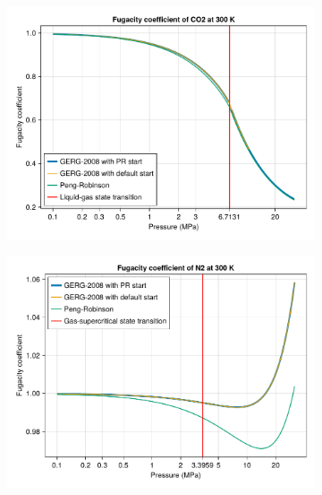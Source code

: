 \documentclass[main.tex]{subfiles}
\begin{document}
\begin{figure}
	\centering
	\begin{subfigure}{0.5\columnwidth}
		\includegraphics[width=\columnwidth]{figures/gcmc/fugacity.pdf}
		\label{fugacityCO2}
	\end{subfigure}\hfill%
	\begin{subfigure}{0.5\columnwidth}
		\includegraphics[width=\columnwidth]{figures/gcmc/fugacity_N2.pdf}
	\end{subfigure}


\end{figure}
\end{document}

